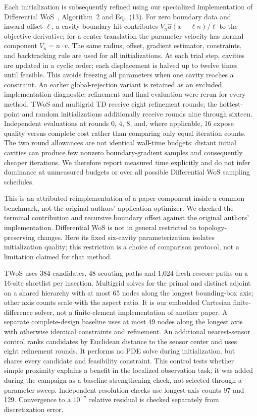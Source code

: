 Each initialization is subsequently refined using our specialized implementation
of Differential WoS~\cite{miller2024differential}, Algorithm~2 and Eq.~(13).
For zero boundary data and inward offset $\ell$, a cavity-boundary hit contributes
$V_n\widehat u(x-\ell n)/\ell$ to the objective derivative; for a center
translation the parameter velocity has normal component $V_n=n\cdot v$.
The same radius, offset, gradient estimator, constraints, and backtracking
rule are used for all initializations. At each trial step, cavities are updated
in a cyclic order; each displacement is halved up to twelve times until feasible.
This avoids freezing all parameters when one cavity reaches a constraint. An
earlier global-rejection variant is retained as an excluded implementation
diagnostic; refinement and final evaluation were rerun for every method. TWoS and multigrid TD receive eight
refinement rounds; the hottest-point and random initializations additionally
receive rounds nine through sixteen. Independent evaluations at rounds
0, 4, 8, and, where applicable, 16 expose quality versus complete cost rather
than comparing only equal iteration counts. The two round allowances are not
identical wall-time budgets: distant initial cavities can produce few nonzero
boundary-gradient samples and consequently cheaper iterations. We therefore
report measured time explicitly and do not infer dominance at unmeasured budgets
or over all possible Differential WoS sampling schedules.

This is an attributed reimplementation of a paper component inside a common
benchmark, not the original authors' application optimizer. We checked the
terminal contribution and recursive boundary offset against the original authors' implementation. Differential WoS is not
in general restricted to topology-preserving changes. Here its fixed six-cavity
parameterization isolates initialization quality; this restriction is a choice
of comparison protocol, not a limitation claimed for that method.

TWoS uses 384 candidates, 48 scouting paths and 1,024 fresh rescore paths on
a 16-site shortlist per insertion. Multigrid solves for the primal and distinct
adjoint on a shared hierarchy with at most 65 nodes along the longest bounding-box
axis; other axis counts scale with the aspect ratio. It is our embedded Cartesian
finite-difference solver, not a finite-element implementation of another paper.
A separate complete-design baseline uses at most 49 nodes along the longest
axis with otherwise identical constraints and refinement. An additional
nearest-sensor control ranks candidates by Euclidean distance to the sensor
center and uses eight refinement rounds. It performs no PDE solve during
initialization, but shares every candidate and feasibility constraint. This
control tests whether simple proximity explains a benefit in the localized
observation task; it was added during the campaign as a baseline-strengthening
check, not selected through a parameter sweep. Independent resolution
checks use longest-axis counts 97 and 129. Convergence
to a $10^{-7}$ relative residual is checked separately from discretization error.


